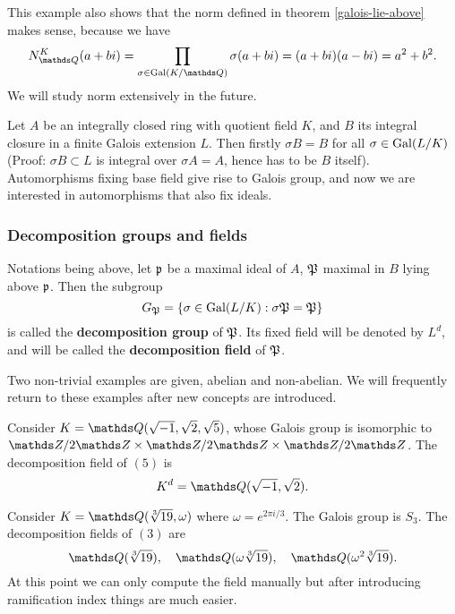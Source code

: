 			This example also shows that the norm defined in theorem \ref{galois-lie-above} makes sense, because we have
			\[
			N_{\Q}^{K}(a+bi)=\prod_{\sigma \in \gal(K/\Q)}\sigma(a+bi) = (a+bi)(a-bi)=a^2+b^2.
			\]
			We will study norm extensively in the future. %
			
			Let $A$ be an integrally closed ring with quotient field $K$, and $B$ its integral closure in a finite Galois extension $L$. Then firstly $\sigma{B}=B$ for all $\sigma \in \operatorname{Gal}(L/K)$ (Proof: $\sigma{B} \subset L$ is integral over $\sigma{A}=A$, hence has to be $B$ itself). Automorphisms fixing base field give rise to Galois group, and now we are interested in automorphisms that also fix ideals. 
			
			\subsubsection{Decomposition groups and fields}
			
				\begin{definition}
					Notations being above, let $\mathfrak{p}$ be a maximal ideal of $A$, $\mathfrak{P}$ maximal in $B$ lying above $\mathfrak{p}$. Then the subgroup
					\[
						G_\mathfrak{P} = \{\sigma \in \operatorname{Gal}(L/K):\sigma\mathfrak{P}=\mathfrak{P}\}
					\]
					is called the \textbf{decomposition group} of $\mathfrak{P}$. Its fixed field will be denoted by $L^d$, and will be called the \textbf{decomposition field} of $\mathfrak{P}$. 
				\end{definition}
				Two non-trivial examples are given, abelian and non-abelian. We will frequently return to these examples after new concepts are introduced. 
				\begin{example}
					Consider $K = \Q(\sqrt{-1},\sqrt{2},\sqrt{5})$, whose Galois group is isomorphic to $\Z/2\Z \times \Z/2\Z \times \Z/2\Z$. The decomposition field of $(5)$ is
					\[
						K^d = \Q(\sqrt{-1},\sqrt{2}).
					\]
				\end{example}
				\begin{example}
					Consider $K = \Q(\sqrt[3]{19},\omega)$ where $\omega = e^{2\pi i/3}$. The Galois group is $S_3$. The decomposition fields of $(3)$ are
					\[
						\Q(\sqrt[3]{19}),\quad \Q(\omega\sqrt[3]{19}),\quad\Q(\omega^2\sqrt[3]{19}).
					\]
					At this point we can only compute the field manually but after introducing ramification index things are much easier. 
				\end{example}
			
